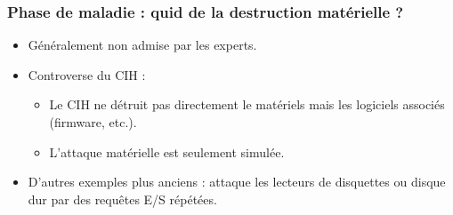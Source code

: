 \documentclass{beamer}
\begin{document}

\begin{frame}
\frametitle{Phase de maladie : quid de la destruction matérielle ?}
\begin{itemize}
\item Généralement non admise par les experts.
\item Controverse du CIH :
  \begin{itemize}
  \item Le CIH ne détruit pas directement le matériels mais les logiciels associés (firmware, etc.).
  \item L'attaque matérielle est seulement simulée.
  \end{itemize}
\item D'autres exemples plus anciens : attaque les lecteurs de disquettes ou disque dur par des requêtes E/S répétées.
\end{itemize}
\end{frame}
\end{document}
